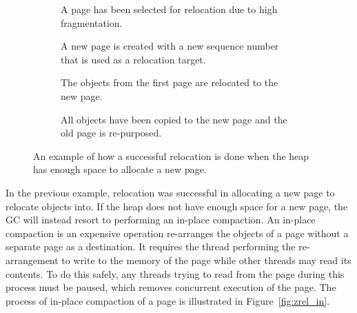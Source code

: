 \begin{figure}[H]
    \centering
    \begin{subfigure}[t]{.2\textwidth}
        \centering
        
        \caption{A page has been selected for relocation due to high fragmentation.}
        \label{fig:zrel_new1}
    \end{subfigure}
    \hfill\vline\hfill
    \begin{subfigure}[t]{.2\textwidth}
        \centering
        
        \caption{A new page is created with a new sequence number that is used as a relocation target.}
        \label{fig:zrel_new2}
    \end{subfigure}
    \hfill\vline\hfill
    \begin{subfigure}[t]{.2\textwidth}
        \centering
        
        \caption{The objects from the first page are relocated to the new page.}
        \label{fig:zrel_new3}
    \end{subfigure}
    \hfill\vline\hfill
    \begin{subfigure}[t]{.2\textwidth}
        \centering
        
        \caption{All objects have been copied to the new page and the old page is re-purposed.}
        \label{fig:zrel_new3}
    \end{subfigure}
    \caption{An example of how a successful relocation is done when the heap has enough space to allocate a new page.}
    \label{fig:zrel_new}
\end{figure}

In the previous example, relocation was successful in allocating a new page to relocate objects into. If the heap does not have enough space for a new page, the GC will instead resort to performing an in-place compaction. An in-place compaction is an expensive operation re-arranges the objects of a page without a separate page as a destination. It requires the thread performing the re-arrangement to write to the memory of the page while other threads may read its contents. To do this safely, any threads trying to read from the page during this process must be paused, which removes concurrent execution of the page. The process of in-place compaction of a page is illustrated in Figure~\ref{fig:zrel_in}.

